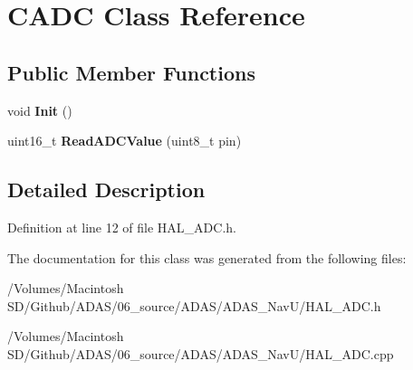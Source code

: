 \hypertarget{class_c_a_d_c}{}\section{C\+A\+DC Class Reference}
\label{class_c_a_d_c}
\subsection*{Public Member Functions}
\begin{DoxyCompactItemize}
\item 
\mbox{\label{class_c_a_d_c_a09118c55821cd6f0c9b2e2d2edd40d33}} 
void {\bfseries Init} ()
\item 
\mbox{\label{class_c_a_d_c_ac2f897fc64f605751ac3ffe7d2704ba6}} 
uint16\+\_\+t {\bfseries Read\+A\+D\+C\+Value} (uint8\+\_\+t pin)
\end{DoxyCompactItemize}


\subsection{Detailed Description}


Definition at line 12 of file H\+A\+L\+\_\+\+A\+D\+C.\+h.



The documentation for this class was generated from the following files\+:\begin{DoxyCompactItemize}
\item 
/\+Volumes/\+Macintosh S\+D/\+Github/\+A\+D\+A\+S/06\+\_\+source/\+A\+D\+A\+S/\+A\+D\+A\+S\+\_\+\+Nav\+U/H\+A\+L\+\_\+\+A\+D\+C.\+h\item 
/\+Volumes/\+Macintosh S\+D/\+Github/\+A\+D\+A\+S/06\+\_\+source/\+A\+D\+A\+S/\+A\+D\+A\+S\+\_\+\+Nav\+U/H\+A\+L\+\_\+\+A\+D\+C.\+cpp\end{DoxyCompactItemize}
